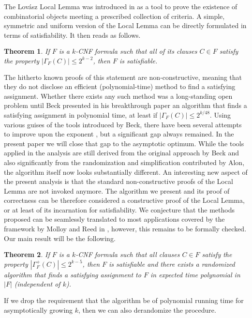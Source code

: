 \documentclass[11pt,a4paper]{article}
\newtheorem{theorem}{Theorem}[section]
\begin{document}
The Lov\'asz Local Lemma was introduced in \cite{EL75} as a tool to prove the existence of
combinatorial objects meeting a prescribed collection of criteria. A simple, symmetric and uniform version of the Local Lemma can be
directly formulated in terms of satisfiability. It then reads as follows.
\begin{theorem}
{\bf \cite{EL75}}
If $F$ is a $k$-CNF formula such that all of its clauses $C \in F$ satisfy the property
$|\Gamma_F(C)| \le 2^{k-2}$, then $F$ is satisfiable.
\end{theorem}

The hitherto known proofs of this statement are non-constructive, meaning that they do not disclose
an efficient (polynomial-time) method to find a satisfying assignment. Whether there exists any
such method was a long-standing open problem until Beck presented in his breakthrough paper \cite{Bec91} 
an algorithm that finds a satisfying assignment in polynomial time, at least if $|\Gamma_F(C)| \le 2^{k/48}$. 
Using various guises of the
tools introduced by Beck, there have been several attempts to improve upon the exponent 
\cite{Alo91, Mos06, Sri08, Mos08},
but a significant gap always remained. In the present paper we will close that gap to the asymptotic optimum.
While the tools applied in the analysis are still derived from the original approach by Beck and also significantly
from the randomization and simplification contributed by Alon, the algorithm itself now looks substantially different.
An interesting new aspect of the present analysis is that the standard non-constructive proofs of the Local Lemma are
not invoked anymore. The algorithm we present and its proof of correctness can be therefore considered
a constructive proof of the Local Lemma, or at least of its incarnation for satisfiability. 
We conjecture that the methods
proposed can be seamlessly translated to most applications covered by the framework by Molloy and Reed in 
\cite{MR98}, however, this remains to be formally checked. Our main result will be the following.

\begin{theorem}
\label{mainthmrnd}
If $F$ is a $k$-CNF formula such that all clauses $C \in F$ satisfy the property
$|\Gamma_F^+(C)| \le 2^{k-5}$, then $F$ is satisfiable and there exists a randomized algorithm
that finds a satisfying assignment to $F$ in expected time polynomial in $|F|$ (independent
of $k$).
\end{theorem}

If we drop the requirement that the algorithm be of polynomial running time for asymptotically growing $k$, 
then we can also derandomize the procedure.
\end{document}
